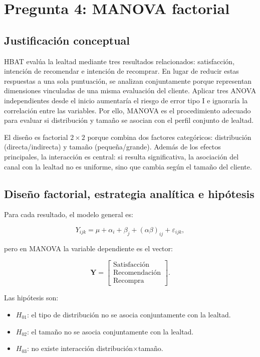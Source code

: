 \documentclass[12pt,letterpaper]{article}
\begin{document}
\newpage
\section{Pregunta 4: MANOVA factorial}

\subsection{Justificación conceptual}

HBAT evalúa la lealtad mediante tres resultados relacionados: satisfacción, intención de recomendar e intención de recomprar. En lugar de reducir estas respuestas a una sola puntuación, se analizan conjuntamente porque representan dimensiones vinculadas de una misma evaluación del cliente. Aplicar tres ANOVA independientes desde el inicio aumentaría el riesgo de error tipo I e ignoraría la correlación entre las variables. Por ello, MANOVA es el procedimiento adecuado para evaluar si distribución y tamaño se asocian con el perfil conjunto de lealtad.

El diseño es factorial $2\times2$ porque combina dos factores categóricos: distribución (directa/indirecta) y tamaño (pequeña/grande). Además de los efectos principales, la interacción es central: si resulta significativa, la asociación del canal con la lealtad no es uniforme, sino que cambia según el tamaño del cliente.

\subsection{Diseño factorial, estrategia analítica e hipótesis}

Para cada resultado, el modelo general es:

\[
Y_{ijk}=\mu+\alpha_i+\beta_j+(\alpha\beta)_{ij}+\varepsilon_{ijk},
\]

pero en MANOVA la variable dependiente es el vector:

\[
\mathbf{Y}=\begin{bmatrix}
\text{Satisfacción}\\
\text{Recomendación}\\
\text{Recompra}
\end{bmatrix}.
\]

Las hipótesis son:

\begin{itemize}
\item $H_{01}$: el tipo de distribución no se asocia conjuntamente con la lealtad.
\item $H_{02}$: el tamaño no se asocia conjuntamente con la lealtad.
\item $H_{03}$: no existe interacción distribución$\times$tamaño.
\end{itemize}
\end{document}
